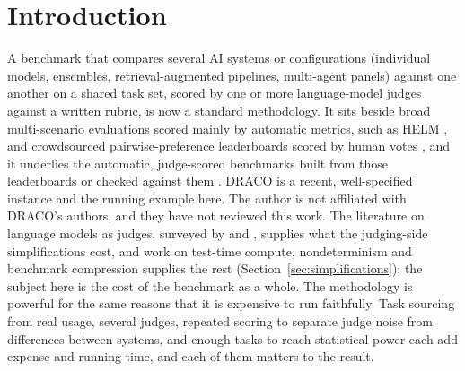 \documentclass[11pt]{article}
\newcommand{\sectionbreak}{\par\ifdim\pagetotal<5.5\baselineskip\relax\else\clearpage\fi}
\newcommand{\Theauthorisare}{The author is}
\begin{document}
\clearpage
{\small\tableofcontents}
\clearpage

\sectionbreak
\section{Introduction}
\label{sec:intro}

A benchmark that compares several AI systems or configurations (individual models, ensembles, retrieval-augmented pipelines, multi-agent panels) against one another on a shared task set, scored by one or more language-model judges against a written rubric, is now a standard methodology. It sits beside broad multi-scenario evaluations scored mainly by automatic metrics, such as HELM \citep{liang2023helm}, and crowdsourced pairwise-preference leaderboards scored by human votes \citep{chiang2024arena}, and it underlies the automatic, judge-scored benchmarks built from those leaderboards or checked against them \citep{li2024arenahard, dubois2024lengthcontrolled}. DRACO \citep{draco2026} is a recent, well-specified instance and the running example here. \Theauthorisare{} not affiliated with DRACO's authors, and they have not reviewed this work. The literature on language models as judges, surveyed by \citet{li2024judgessurvey} and \citet{li2025generationjudgment}, supplies what the judging-side simplifications cost, and work on test-time compute, nondeterminism and benchmark compression supplies the rest (Section~\ref{sec:simplifications}); the subject here is the cost of the benchmark as a whole. The methodology is powerful for the same reasons that it is expensive to run faithfully. Task sourcing from real usage, several judges, repeated scoring to separate judge noise from differences between systems, and enough tasks to reach statistical power each add expense and running time, and each of them matters to the result.
\end{document}
